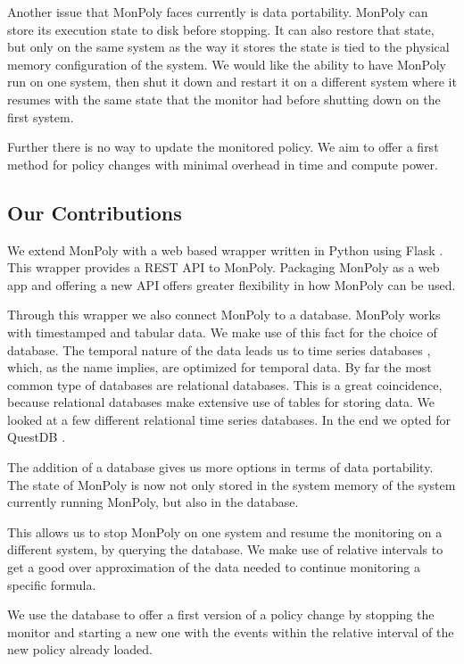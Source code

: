 Another issue that MonPoly faces currently is data portability.
MonPoly can store its execution state to disk before stopping.
It can also restore that state, but only on the same system as the way it stores the state is tied to the physical memory configuration of the system.
We would like the ability to have MonPoly run on one system, then shut it down and restart it on a different system where it resumes with the same state that the monitor had before shutting down on the first system.

Further there is no way to update the monitored policy.
We aim to offer a first method for policy changes with minimal overhead in time and compute power.

\subsection{Our Contributions}
We extend MonPoly with a web based wrapper written in Python using Flask \cite{}.
This wrapper provides a REST API \cite{} to MonPoly.
Packaging MonPoly as a web app and offering a new API offers greater flexibility in how MonPoly can be used.

Through this wrapper we also connect MonPoly to a database.
MonPoly works with timestamped and tabular data.
We make use of this fact for the choice of database.
The temporal nature of the data leads us to time series databases \cite{}, which, as the name implies, are optimized for temporal data.
By far the most common type of databases are relational databases.
This is a great coincidence, because relational databases make extensive use of tables for storing data.
We looked at a few different relational time series databases.
In the end we opted for QuestDB \cite{questdb}.

The addition of a database gives us more options in terms of data portability.
The state of MonPoly is now not only stored in the system memory of the system currently running MonPoly, but also in the database.

This allows us to stop MonPoly on one system and resume the monitoring on a different system, by querying the database.
We make use of relative intervals \cite{} to get a good over approximation of the data needed to continue monitoring a specific formula.

We use the database to offer a first version of a policy change by stopping the monitor and starting a new one with the events within the relative interval of the new policy already loaded.



